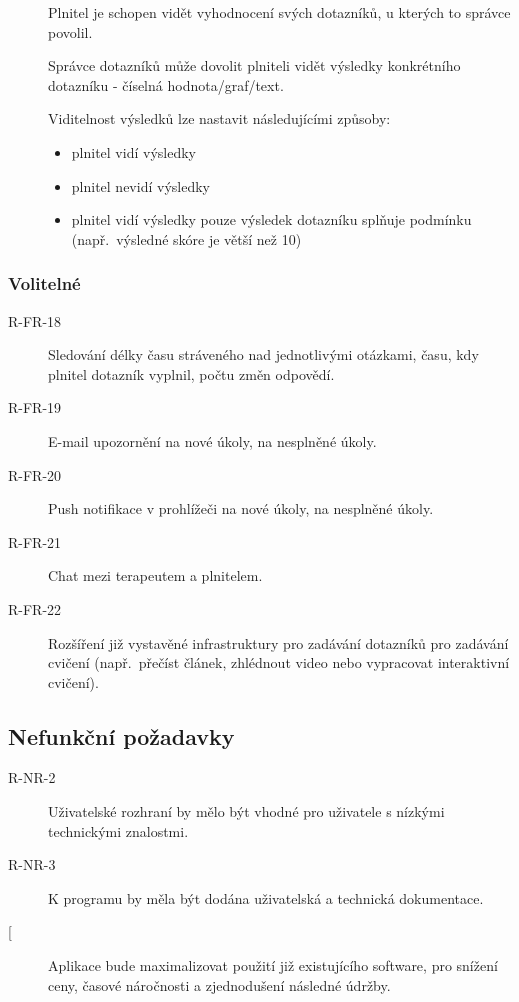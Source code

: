 \begin{description}
    \item[]
    Plnitel je schopen vidět vyhodnocení svých dotazníků, u kterých to správce povolil.
    \item[]
    Správce dotazníků může dovolit plniteli vidět výsledky konkrétního dotazníku - číselná hodnota/graf/text.
    \item[]
    Viditelnost výsledků lze nastavit následujícími způsoby:

    \begin{itemize}
        \item
        plnitel vidí výsledky
        \item
        plnitel nevidí výsledky
        \item
        plnitel vidí výsledky pouze výsledek dotazníku splňuje podmínku (např.\ výsledné skóre je větší než 10)
    \end{itemize}
\end{description}

\subsubsection{Volitelné}

\begin{description}
    \item[R-FR-18]
    Sledování délky času stráveného nad jednotlivými otázkami, času, kdy plnitel dotazník vyplnil, počtu změn odpovědí.
    \item[R-FR-19]
    E-mail upozornění na nové úkoly, na nesplněné úkoly.
    \item[R-FR-20]
    Push notifikace v prohlížeči na nové úkoly, na nesplněné úkoly.
    \item[R-FR-21]
    Chat mezi terapeutem a plnitelem.
    \item[R-FR-22]
    Rozšíření již vystavěné infrastruktury pro zadávání dotazníků pro zadávání cvičení (např.\ přečíst článek, zhlédnout video nebo vypracovat interaktivní cvičení).
\end{description}

\subsection{Nefunkční požadavky}\label{subsec:nefunkcni-pozadavky}

\begin{description}
    \item[R-NR-2]
    Uživatelské rozhraní by mělo být vhodné pro uživatele s nízkými technickými znalostmi.
    \item[R-NR-3]
    K programu by měla být dodána uživatelská a technická dokumentace.
    \item[[]
    Aplikace bude maximalizovat použití již existujícího software, pro snížení ceny, časové náročnosti a zjednodušení následné údržby.
\end{description}

